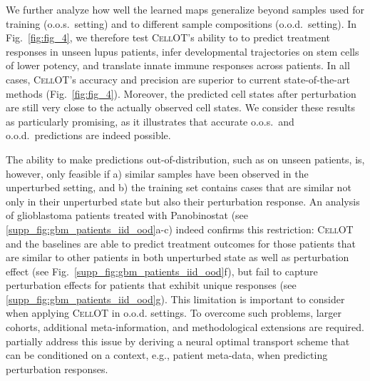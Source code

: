 We further analyze how well the learned maps generalize beyond samples used for training (o.o.s.~setting) and to different sample compositions (o.o.d.~setting). In Fig.~\ref{fig:fig_4}, we therefore test \textsc{CellOT}'s ability to
to predict treatment responses in unseen lupus patients, infer developmental trajectories on stem cells of lower potency, and translate innate immune responses across patients. In all cases, \textsc{CellOT}'s accuracy and precision are superior to current state-of-the-art methods (Fig.~\ref{fig:fig_4}). Moreover, the predicted cell states after perturbation are still very close to the actually observed cell states. We consider these results as particularly promising, as it illustrates that accurate o.o.s.~and o.o.d.~predictions are indeed possible.

\smallskip

The ability to make predictions out-of-distribution, such as on unseen patients, is, however, only feasible if a) similar samples have been observed in the unperturbed setting, and b) the training set contains cases that are similar not only in their unperturbed state but also their perturbation response.
An analysis of glioblastoma patients treated with Panobinostat \citep{zhao2021deconvolution} (see \ref{supp_fig:gbm_patients_iid_ood}a-c) indeed confirms this restriction:
\textsc{CellOT} and the baselines are able to predict treatment outcomes for those patients that are similar to other patients in both unperturbed state as well as perturbation effect (see Fig.~\ref{supp_fig:gbm_patients_iid_ood}f), but fail to capture perturbation effects for patients that exhibit unique responses (see \ref{supp_fig:gbm_patients_iid_ood}g).
This limitation is important to consider when applying \textsc{CellOT} in o.o.d. settings. To overcome such problems, 
larger cohorts, additional meta-information, and methodological extensions are required. \citet{bunne2022supervised} partially address this issue by deriving a neural optimal transport scheme that can be conditioned on a context, e.g., patient meta-data, when predicting perturbation responses.

